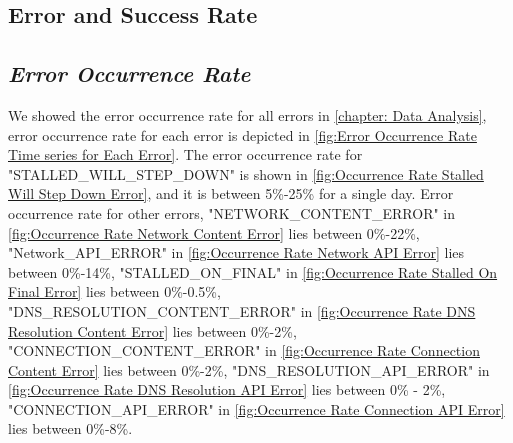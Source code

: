 \subsection{Error and Success Rate}
\subsection*{\textit{Error Occurrence Rate}}

We showed the error occurrence rate for all errors in \cref{chapter: Data Analysis}, error occurrence rate for each error is depicted in \cref{fig:Error Occurrence Rate Time series for Each Error}.
The error occurrence rate for "STALLED\_WILL\_STEP\_DOWN" is shown in \cref{fig:Occurrence Rate Stalled Will Step Down Error}, and it is between 5\%-25\% for a single day. Error occurrence rate for other errors, "NETWORK\_CONTENT\_ERROR" in 
\cref{fig:Occurrence Rate Network Content Error} lies between 0\%-22\%, "Network\_API\_ERROR" in \cref{fig:Occurrence Rate Network API Error} lies between 0\%-14\%, "STALLED\_ON\_FINAL" in \cref{fig:Occurrence Rate Stalled On Final Error}
lies between 0\%-0.5\%, "DNS\_RESOLUTION\_CONTENT\_ERROR" in \cref{fig:Occurrence Rate DNS Resolution Content Error} lies between 0\%-2\%, "CONNECTION\_CONTENT\_ERROR" in \cref{fig:Occurrence Rate Connection Content Error} lies between 0\%-2\%,
"DNS\_RESOLUTION\_API\_ERROR" in \cref{fig:Occurrence Rate DNS Resolution API Error} lies between 0\% - 2\%, "CONNECTION\_API\_ERROR" in \cref{fig:Occurrence Rate Connection API Error} lies between 0\%-8\%.


